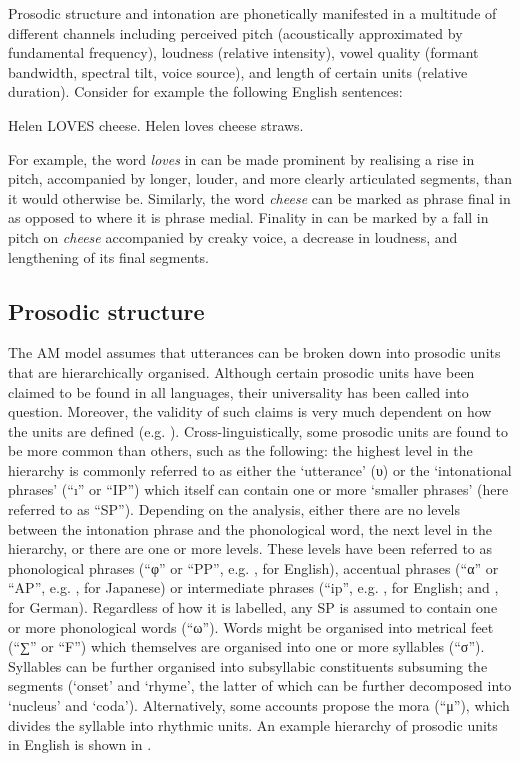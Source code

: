 \newpage 
Prosodic structure and intonation are phonetically manifested in a multitude of different channels including perceived pitch (acoustically approximated by fundamental frequency), loudness (relative intensity), vowel quality (formant bandwidth, spectral tilt, voice source), and length of certain units (relative duration). Consider for example the following English sentences:

\begin{exe}
\ex\label{ex:2:1}   Helen LOVES cheese. 
\ex\label{ex:2:2}   Helen  loves cheese straws.
\end{exe}

For example, the word \textit{loves} in  can be made prominent by realising a rise in pitch, accompanied by longer, louder, and more clearly articulated segments, than it would otherwise be. Similarly, the word \textit{cheese} can be marked as phrase final in  as opposed to  where it is phrase medial. Finality in  can be marked by a fall in pitch on \textit{cheese} accompanied by creaky voice, a decrease in loudness, and lengthening of its final segments. 

\subsection{Prosodic structure}
The AM model assumes that utterances can be broken down into prosodic units that are hierarchically organised. Although certain prosodic units have been claimed to be found in all languages, their universality has been called into question. Moreover, the validity of such claims is very much dependent on how the units are defined (e.g. \citealt{Schiering.etal2010,Hyman2011}). Cross-linguistically, some prosodic units are found to be more common than others, such as the following: the highest level in the hierarchy is commonly referred to as either the ‘utterance’ (υ) or the ‘intonational phrases’ (“ı” or “IP”) which itself can contain one or more ‘smaller phrases’ (here referred to as “SP”). Depending on the analysis, either there are no levels between the intonation phrase and the phonological word, the next level in the hierarchy, or there are one or more levels. These levels have been referred to as phonological phrases (“φ” or “PP”, e.g. \citealt{Gussenhoven2004}, for English), accentual phrases (“α” or “AP”, e.g. \citealt{PierrBeck1988}, for Japanese) or intermediate phrases (“ip”, e.g.  \citealt{BeckmanPierr1986}, for English; and \citealt{Grice.etal2005ger}, for German). Regardless of how it is labelled, any SP is assumed to contain one or more phonological words (“ω”). Words might be organised into metrical feet (“∑” or “F”) which themselves are organised into one or more syllables (“σ”). Syllables can be further organised into subsyllabic constituents subsuming the segments (‘onset’ and ‘rhyme’, the latter of which can be further decomposed into ‘nucleus’ and ‘coda’). Alternatively, some accounts propose the mora (“μ”), which divides the syllable into rhythmic units. An example hierarchy of prosodic units in English is shown in .

